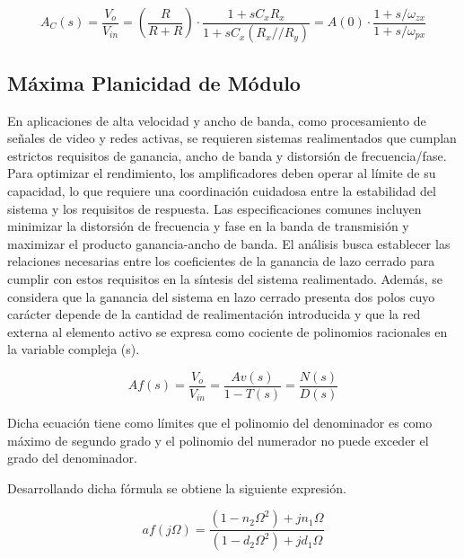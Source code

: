 \documentclass[12pt,A4paper,titlepage]{article}
\begin{document}
\begin{equation}
    A_C (s) = \frac{V_o}{V_{in}} = \left( \frac{R}{R + R} \right) \cdot \frac{1 + sC_x R_x}{1 + sC_x (R_x // R_y)} = A(0) \cdot \frac{1 + s/\omega _{zx}}{1 + s/ \omega _{px}}
\end{equation}

\newpage
\subsection{Máxima Planicidad de Módulo}

\hspace{1mm}En aplicaciones de alta velocidad y ancho de banda, como procesamiento de señales de video y redes activas, se requieren sistemas realimentados que cumplan estrictos requisitos de ganancia, ancho de banda y distorsión de frecuencia/fase. Para optimizar el rendimiento, los amplificadores deben operar al límite de su capacidad, lo que requiere una coordinación cuidadosa entre la estabilidad del sistema y los requisitos de respuesta. Las especificaciones comunes incluyen minimizar la distorsión de frecuencia y fase en la banda de transmisión y maximizar el producto ganancia-ancho de banda. El análisis busca establecer las relaciones necesarias entre los coeficientes de la ganancia de lazo cerrado para cumplir con estos requisitos en la síntesis del sistema realimentado. Además, se considera que la ganancia del sistema en lazo cerrado presenta dos polos cuyo carácter depende de la cantidad de realimentación introducida y que la red externa al elemento activo se expresa como cociente de polinomios racionales en la variable compleja (s).

\begin{equation}
    Af(s) =  \frac{V_o}{V_{in}} = \frac{Av (s)}{1 - T(s)} = \frac{N(s)}{D(s)}
\end{equation}

\bigskip
\hspace{1mm} Dicha ecuación tiene como límites que el polinomio del denominador es como máximo de segundo grado y el polinomio del numerador no puede exceder el grado del denominador.

\hspace{1mm} Desarrollando dicha fórmula se obtiene la siguiente expresión.

\begin{equation}
    af(j \Omega) = \frac{(1 - n_2 \Omega ^2) + jn_1 \Omega}{(1 - d_2 \Omega ^2) + jd_1 \Omega}
\end{equation}
\end{document}
